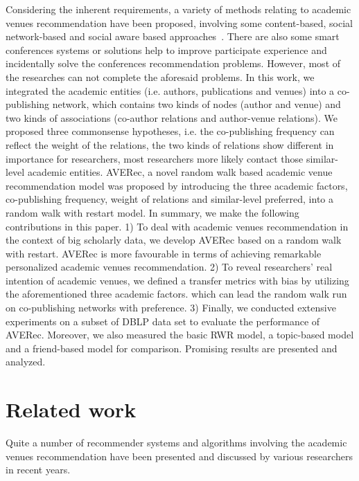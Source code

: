 \documentclass[9pt]{acm_proc_article-sp}
\begin{document}
Considering the inherent requirements, a variety of methods relating to academic venues recommendation have been proposed, involving some content-based, social network-based and social aware based approaches~\cite{xia2013socially,xia2014socially}. There are also some smart conferences systems or solutions help to improve participate experience and incidentally solve the conferences recommendation problems. However, most of the researches can not complete the aforesaid problems. In this work, we integrated the academic entities (i.e. authors, publications and venues) into a co-publishing network, which contains two kinds of nodes (author and venue) and two kinds of associations (co-author relations and author-venue relations). We proposed three commonsense  hypotheses, i.e. the co-publishing frequency can reflect the weight of the relations, the two kinds of relations show different in importance for researchers, most researchers more likely contact those similar-level academic entities. AVERec, a novel random walk based academic venue recommendation model was proposed by introducing the three academic factors, co-publishing frequency, weight of relations and similar-level preferred, into a random walk with restart model. In summary, we make the following contributions in this paper. 1) To deal with academic venues recommendation in the context of big scholarly data, we develop AVERec based on a random walk with restart. AVERec is more favourable in terms of achieving remarkable personalized academic venues recommendation. 2) To reveal researchers' real intention of academic venues, we defined a transfer metrics with bias by utilizing the aforementioned three academic factors. which can lead the random walk run on co-publishing networks with preference. 3) Finally, we conducted extensive experiments on a subset of DBLP data set to evaluate the performance of AVERec. Moreover, we also measured the basic RWR model, a topic-based model and a friend-based model for comparison. Promising results are presented and analyzed.

\section{Related work}
Quite a number of recommender systems and algorithms involving the academic venues recommendation have been presented and discussed by various researchers in recent years.
\end{document}
